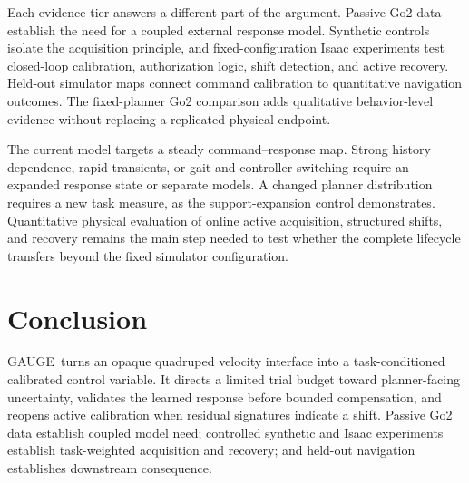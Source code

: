 \documentclass[letterpaper,10pt,conference]{ieeeconf}
\newcommand{\method}{GAUGE}
\begin{document}
Each evidence tier answers a different part of the argument. Passive Go2 data
establish the need for a coupled external response model. Synthetic controls
isolate the acquisition principle, and fixed-configuration Isaac experiments test
closed-loop calibration, authorization logic, shift detection, and active
recovery. Held-out simulator maps connect command calibration to quantitative
navigation outcomes. The fixed-planner Go2 comparison adds qualitative
behavior-level evidence without replacing a replicated physical endpoint.

The current model targets a steady command--response map. Strong history
dependence, rapid transients, or gait and controller switching require an
expanded response state or separate models. A changed planner distribution
requires a new task measure, as the support-expansion control demonstrates.
Quantitative physical evaluation of online active acquisition, structured
shifts, and recovery remains the main step needed to test whether the complete
lifecycle transfers beyond the fixed simulator configuration.

\section{Conclusion}

\method\ turns an opaque quadruped velocity interface into a task-conditioned
calibrated control variable. It directs a limited trial budget toward
planner-facing uncertainty, validates the learned response before bounded
compensation, and reopens active calibration when residual signatures indicate
a shift. Passive Go2 data establish coupled model need; controlled synthetic
and Isaac experiments establish task-weighted acquisition and recovery; and
held-out navigation establishes downstream consequence.

\newpage
{}


\end{document}
